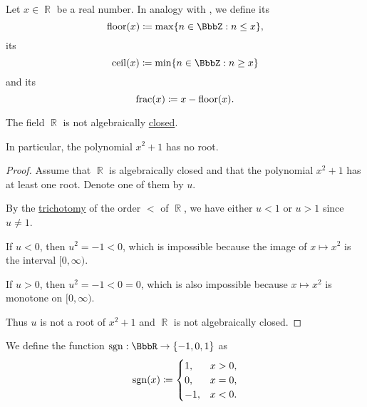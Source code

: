 \begin{definition}\label{def:floor_ceiling_functions}
  Let \( x \in \BbbR \) be a real number. In analogy with , we define its 
  \begin{equation*}
    \floor(x) \coloneqq \max \{ n \in \BbbZ : n \leq x \},
  \end{equation*}
  its 
  \begin{equation*}
    \ceil(x) \coloneqq \min \{ n \in \BbbZ : n \geq x \}
  \end{equation*}
  and its 
  \begin{equation*}
    \operatorname{frac}(x) \coloneqq x - \operatorname{floor}(x).
  \end{equation*}
\end{definition}

\begin{proposition}\label{thm:reals_not_algebraically_closed}
  The field \( \BbbR \) is not algebraically \hyperref[def:algebraically_closed_field]{closed}.

  In particular, the polynomial \( x^2 + 1 \) has no root.
\end{proposition}
\begin{proof}
  Assume that \( \BbbR \) is algebraically closed and that the polynomial \( x^2 + 1 \) has at least one root. Denote one of them by \( u \).

  By the \hyperref[def:binary_relation/trichotomic]{trichotomy} of the order \( < \) of \( \BbbR \), we have either \( u < 1 \) or \( u > 1 \) since \( u \neq 1 \).

  If \( u < 0 \), then \( u^2 = -1 < 0 \), which is impossible because the image of \( x \mapsto x^2 \) is the interval \( [0, \infty) \).

  If \( u > 0 \), then \( u^2 = -1 < 0 = 0 \), which is also impossible because \( x \mapsto x^2 \) is monotone on \( [0, \infty) \).

  Thus \( u \) is not a root of \( x^2 + 1 \) and \( \BbbR \) is not algebraically closed.
\end{proof}

\begin{definition}\label{def:signum}
  We define the  function \( \sgn: \BbbR \to \{ -1, 0, 1 \} \) as
  \begin{equation*}
    \operatorname{sgn}(x) \coloneqq \begin{cases}
      1,  & x > 0, \\
      0,  & x = 0, \\
      -1, & x < 0.
    \end{cases}
  \end{equation*}
\end{definition}
